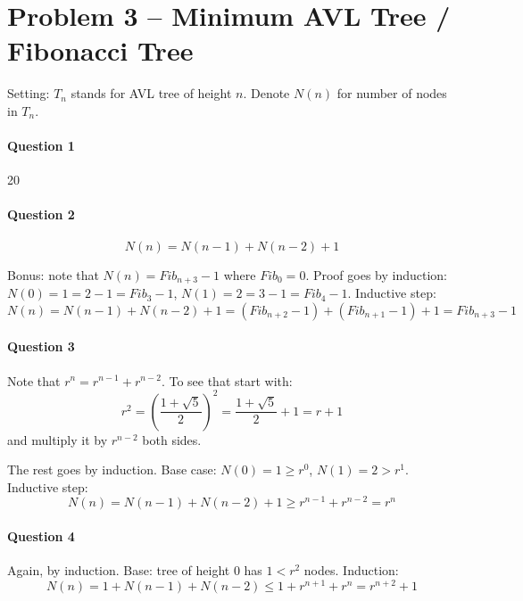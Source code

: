 \section{Problem 3 – Minimum AVL Tree / Fibonacci Tree}

Setting: $T_n$ stands for AVL tree of height $n$.
Denote $N(n)$ for number of nodes in $T_n$.

\paragraph{Question 1}
20

\paragraph{Question 2}
\begin{equation*}
    N(n) = N(n-1) + N(n-2) + 1 
\end{equation*}

Bonus: note that $N(n) = Fib_{n+3} - 1$  where $Fib_0 = 0$.
Proof goes by induction: 
$N(0) = 1 = 2 - 1 = Fib_3 - 1$, 
$N(1) = 2 = 3 - 1 = Fib_4 - 1$.
Inductive step:
\begin{equation*}
N(n) = N(n-1) + N(n-2) + 1 = (Fib_{n+2} - 1) + (Fib_{n+1} - 1) + 1 = Fib_{n+3}-1    
\end{equation*}


\paragraph{Question 3}
Note that $r^n = r^{n-1} + r^{n-2}$.
To see that start with:
\begin{equation*}
 r^2 = (\frac{1+\sqrt{5}}{2})^2 = \frac{1+\sqrt{5}}{2} + 1 = r+1   
\end{equation*}
and multiply it by $r^{n-2}$ both sides.

The rest goes by induction. 
Base case: $N(0) = 1 \geq r^0$, $N(1) = 2 > r^1$.
Inductive step:
\begin{equation*}
    N(n) = N(n-1) + N(n-2) + 1 \geq r^{n-1} + r^{n-2} = r^n
\end{equation*}


\paragraph{Question 4}
Again, by induction. 
Base: tree of height $0$ has $1< r^2$ nodes.
Induction:
\begin{equation*}
    N(n) = 1 + N(n-1) + N(n-2) \leq 1 + r^{n+1} + r^{n} = r^{n+2} + 1
\end{equation*}


